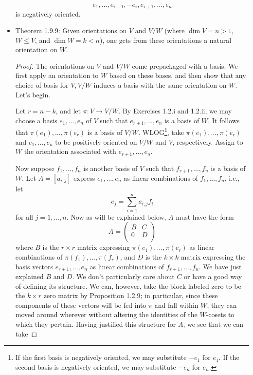 \documentclass[../notes.tex]{subfiles}
\begin{document}
\begin{itemize}
    \begin{equation*}
        e_1,\dots,e_{i-1},-e_i,e_{i+1},\dots,e_n
    \end{equation*}
    is negatively oriented.
    \item Theorem 1.9.9: Given orientations on $V$ and $V/W$ (where $\dim V=n>1$, $W\leq V$, and $\dim W=k<n$), one gets from these orientations a natural orientation on $W$.
    \begin{proof}
        The orientations on $V$ and $V/W$ come prepackaged with a basis. We first apply an orientation to $W$ based on these bases, and then show that any choice of basis for $V,V/W$ induces a basis with the same orientation on $W$. Let's begin.\par
        Let $r=n-k$, and let $\pi:V\to V/W$. By Exercises 1.2.i and 1.2.ii, we may choose a basis $e_1,\dots,e_n$ of $V$ such that $e_{r+1},\dots,e_n$ is a basis of $W$. It follows that $\pi(e_1),\dots,\pi(e_r)$ is a basis of $V/W$. WLOG\footnote{If the first basis is negatively oriented, we may substitute $-e_1$ for $e_1$. If the second basis is negatively oriented, we may substitute $-e_n$ for $e_n$.}, take $\pi(e_1),\dots,\pi(e_r)$ and $e_1,\dots,e_n$ to be positively oriented on $V/W$ and $V$, respectively. Assign to $W$ the orientation associated with $e_{r+1},\dots,e_n$.\par
        Now suppose $f_1,\dots,f_n$ is another basis of $V$ such that $f_{r+1},\dots,f_n$ is a basis of $W$. Let $A=[a_{i,j}]$ express $e_1,\dots,e_n$ as linear combinations of $f_1,\dots,f_n$, i.e., let
        \begin{equation*}
            e_j = \sum_{i=1}^na_{i,j}f_i
        \end{equation*}
        for all $j=1,\dots,n$. Now as will be explained below, $A$ must have the form
        \begin{equation*}
            A =
            \begin{pmatrix}
                B & C\\
                0 & D\\
            \end{pmatrix}
        \end{equation*}
        where $B$ is the $r\times r$ matrix expressing $\pi(e_1),\dots,\pi(e_r)$ as linear combinations of $\pi(f_1),\dots,\pi(f_r)$, and $D$ is the $k\times k$ matrix expressing the basis vectors $e_{r+1},\dots,e_n$ as linear combinations of $f_{r+1},\dots,f_n$. We have just explained $B$ and $D$. We don't particularly care about $C$ or have a good way of defining its structure. We can, however, take the block labeled zero to be the $k\times r$ zero matrix by Proposition 1.2.9; in particular, since these components of these vectors will be fed into $\pi$ and fall within $W$, they can moved around wherever without altering the identities of the $W$-cosets to which they pertain. Having justified this structure for $A$, we see that we can take

\end{proof}
\end{itemize}
\end{document}
